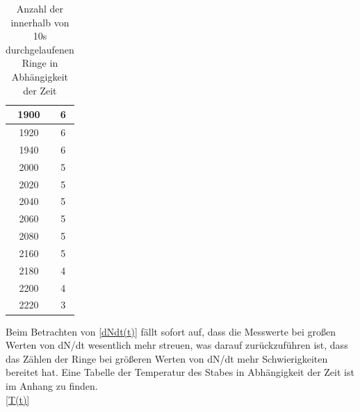 \begin{table}
\begin{tabular}{|c|c|}
\hline
1900&	6\\ 
\hline
1920&	6\\ 
\hline
1940&	6\\ 
\hline
2000&	5\\ 
\hline
2020&	5\\ 
\hline
2040&	5\\ 
\hline
2060&	5\\ 
\hline
2080&	5\\ 
\hline
2160&	5\\ 
\hline
2180&	4\\ 
\hline
2200&	4\\ 
\hline
2220&	3\\ 
\hline
\end{tabular} 

\label{tbl_1}
\caption{Anzahl der innerhalb von 10s durchgelaufenen Ringe in Abhängigkeit der Zeit}
\end{table}

Beim Betrachten von \ref{dNdt(t)} fällt sofort auf, dass die Messwerte bei großen Werten von dN/dt wesentlich mehr streuen, was darauf zurückzuführen ist, dass das Zählen der Ringe bei größeren Werten von dN/dt mehr Schwierigkeiten bereitet hat.
Eine Tabelle der Temperatur des Stabes in Abhängigkeit der Zeit ist im Anhang zu finden. \\
\ref{T(t)}


